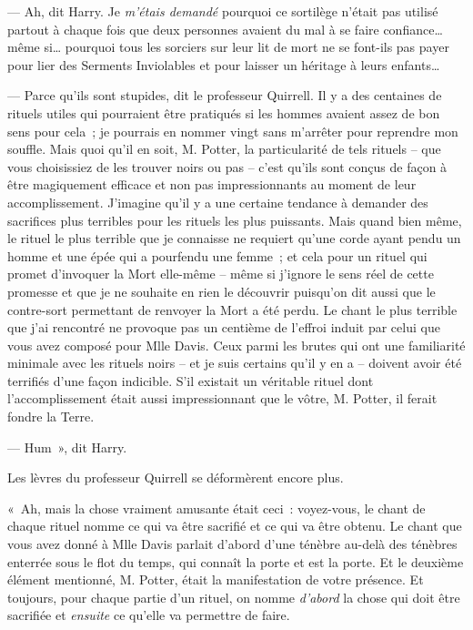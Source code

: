 --- Ah, dit Harry.
Je \emph{m'étais demandé} pourquoi ce sortilège n'était pas utilisé partout à chaque fois que deux personnes avaient du mal à se faire confiance… même si… pourquoi tous les sorciers sur leur lit de mort ne se font-ils pas payer pour lier des Serments Inviolables et pour laisser un héritage à leurs enfants…

--- Parce qu'ils sont stupides, dit le professeur Quirrell.
Il y a des centaines de rituels utiles qui pourraient être pratiqués si les hommes avaient assez de bon sens pour cela~; je pourrais en nommer vingt sans m'arrêter pour reprendre mon souffle.
Mais quoi qu'il en soit, M. Potter, la particularité de tels rituels -- que vous choisissiez de les trouver noirs ou pas -- c'est qu'ils sont conçus de façon à être magiquement efficace et non pas impressionnants au moment de leur accomplissement.
J'imagine qu'il y a une certaine tendance à demander des sacrifices plus terribles pour les rituels les plus puissants.
Mais quand bien même, le rituel le plus terrible que je connaisse ne requiert qu'une corde ayant pendu un homme et une épée qui a pourfendu une femme~; et cela pour un rituel qui promet d'invoquer la Mort elle-même -- même si j'ignore le sens réel de cette promesse et que je ne souhaite en rien le découvrir puisqu'on dit aussi que le contre-sort permettant de renvoyer la Mort a été perdu.
Le chant le plus terrible que j'ai rencontré ne provoque pas un centième de l'effroi induit par celui que vous avez composé pour Mlle Davis.
Ceux parmi les brutes qui ont une familiarité minimale avec les rituels noirs -- et je suis certains qu'il y en a -- doivent avoir été terrifiés d'une façon indicible.
S'il existait un véritable rituel dont l'accomplissement était aussi impressionnant que le vôtre, M. Potter, il ferait fondre la Terre.

--- Hum~», dit Harry.

Les lèvres du professeur Quirrell se déformèrent encore plus.

«~Ah, mais la chose vraiment amusante était ceci~: voyez-vous, le chant de chaque rituel nomme ce qui va être sacrifié et ce qui va être obtenu.
Le chant que vous avez donné à Mlle Davis parlait d'abord d'une ténèbre au-delà des ténèbres enterrée sous le flot du temps, qui connaît la porte et est la porte.
Et le deuxième élément mentionné, M. Potter, était la manifestation de votre présence.
Et toujours, pour chaque partie d'un rituel, on nomme \emph{d'abord} la chose qui doit être sacrifiée et \emph{ensuite} ce qu'elle va permettre de faire.

